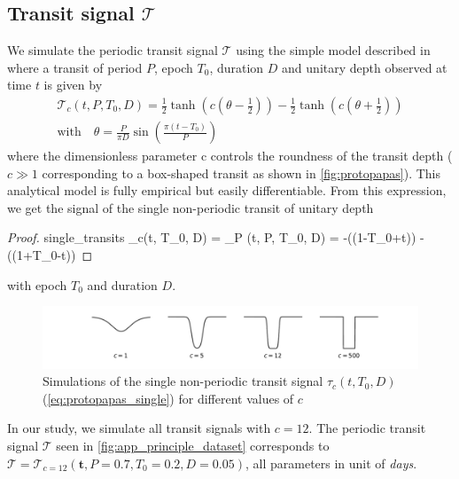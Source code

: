 \documentclass{aastex631}
\begin{document}
\subsection{Transit signal $\mathcal{T}$}\label{app_proto}
We simulate the periodic transit signal $\mathcal{T}$ using the simple model described in \cite{protopapas} where a transit of period $P$, epoch $T_0$, duration $D$ and unitary depth observed at time $t$ is given by
\begin{equation}
    \begin{gathered}
        \mathcal{T}_c(t, P, T_0, D) = \frac{1}{2}\tanh\left(c\left(\theta - \frac{1}{2}\right)\right) - \frac{1}{2}\tanh\left(c\left(\theta + \frac{1}{2}\right)\right) \\
        \text{with}\quad\theta = \frac{P}{\pi  D}\sin\left(\frac{\pi(t-T_0)}{P}\right)
    \end{gathered}
\end{equation}
where the dimensionless parameter c controls the roundness of the transit depth ($c\gg1$ corresponding to a box-shaped transit as shown in \autoref{fig:protopapas}). This analytical model is fully empirical but easily differentiable. From this expression, we get the signal of the single non-periodic transit of unitary depth 
\begin{proof}{single_transits}\label{eq:protopapas_single}
    \tau_c(t, T_0, D) = \lim_{P\to \infty} (t, P, T_0, D) = -\tan\left((1-T_0+t)\right) -\tan\left((1+T_0-t)\right)
\end{proof}
with epoch $T_0$ and duration $D$.

\begin{figure}[H]
    \begin{centering}
        \includegraphics[width=0.9\linewidth]{../figures/protopapas.pdf}
        \caption{Simulations of the single non-periodic transit signal $\tau_c(t, T_0, D)$ (\autoref{eq:protopapas_single}) for different values of $c$}
        \label{fig:protopapas}
    \end{centering}
\end{figure}
In our study, we simulate all transit signals with $c=12$. The periodic transit signal $\mathcal{T}$ seen in \autoref{fig:app_principle_dataset} corresponds to $\mathcal{T} = \mathcal{T}_{c=12}(\bm{t}, P=0.7, T_0=0.2, D=0.05)$, all parameters in unit of \textit{days}.
\end{document}
